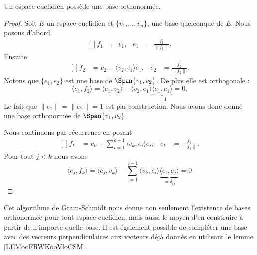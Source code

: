\begin{proposition}    \label{PropUMtEqkb}
	Un espace euclidien possède une base orthonormée.
\end{proposition}

\begin{proof}
	Soit \( E\) un espace euclidien et \( \{ v_1,\ldots, v_n \}\), une base quelconque de \( E\). Nous posons d'abord
	\begin{equation}
		\begin{aligned}[]
			f_1 & =v_1, & e_1 & =\frac{ f_1 }{ \| f_1 \| }.
		\end{aligned}
	\end{equation}
	Ensuite
	\begin{equation}
		\begin{aligned}[]
			f_2 & =v_2-\langle v_2, e_1\rangle e_1, & e_2 & =\frac{ f_2 }{ \| f_2 \| }.
		\end{aligned}
	\end{equation}
	Notons que \( \{ e_1,e_2 \}\) est une base de \( \Span\{ v_1,v_2 \}\). De plus elle est orthogonale :
	\begin{equation}
		\langle e_1, f_2\rangle =\langle e_1, v_2\rangle -\langle v_2, e_1\rangle \underbrace{\langle e_1, e_1\rangle}_{=1} =0.
	\end{equation}
	Le fait que \( \| e_1 \|=\| e_2 \|=1\) est par construction. Nous avons donc donné une base orthonormée de \( \Span\{ v_1,v_2 \}\).

	Nous continuons par récurrence en posant
	\begin{equation}
		\begin{aligned}[]
			f_k & =v_k-\sum_{i=1}^{k-1}\langle v_k, e_i\rangle e_i, & e_k & =\frac{ f_k }{ \| f_k \| }.
		\end{aligned}
	\end{equation}
	Pour tout \( j<k\) nous avons
	\begin{equation}
		\langle e_j, f_k\rangle =\langle e_j, v_k\rangle -\sum_{i=1}^{k-1}\langle v_k, e_i\rangle \underbrace{\langle e_i, e_j\rangle}_{=\delta_{ij}} =0
	\end{equation}
\end{proof}
Cet algorithme de Gram-Schmidt nous donne non seulement l'existence de bases orthonormée pour tout espace euclidien, mais aussi le moyen d'en construire à partir de n'importe quelle base. Il est également possible de compléter une base avec des vecteurs perpendiculaires aux vecteurs déjà donnés en utilisant le lemme \ref{LEMooFRWKooVloCSM}.


